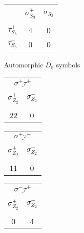 \documentclass[12pt]{article}
\begin{document}
\begin{center}
\begin{tabular}{ c | c | c |}
\multicolumn{1}{c}{} & \multicolumn{1}{c}{} & \multicolumn{1}{c}{}\\
\multicolumn{1}{c}{} & \multicolumn{1}{c}{$\sigma_{S_3}^+$} & \multicolumn{1}{c}{$\sigma_{S_3}^-$} \\[-1em]
\multicolumn{1}{c}{} & \multicolumn{1}{c}{} & \multicolumn{1}{c}{} \\
\cline{2-3} $\tau_{S_3}^+$ & 4 & 0 \\
\cline{2-3} $\tau_{S_3}^-$ & 0 & 0 \\
\cline{2-3}
\end{tabular}
\vspace{.6cm}

Automorphic $D_5$ symbols

\begin{tabular}{| c | c |}
\multicolumn{2}{c}{$\underline{\sigma^+ \tau^+}$} \\[-1em]
\multicolumn{1}{c}{} & \multicolumn{1}{c}{} \\
\multicolumn{1}{c}{$\sigma_{Z_2}^+$} & \multicolumn{1}{c}{$\sigma_{Z_2}^-$} \\[-1em]
\multicolumn{1}{c}{} & \multicolumn{1}{c}{} \\
\hline
22 & 0 \\
\hline
\end{tabular} 
\hspace{1.2cm}
\begin{tabular}{| c | c |}
\multicolumn{2}{c}{$\underline{\sigma^+ \tau^-}$} \\[-1em]
\multicolumn{1}{c}{} & \multicolumn{1}{c}{} \\
\multicolumn{1}{c}{$\sigma_{Z_2}^+$} & \multicolumn{1}{c}{$\sigma_{Z_2}^-$} \\[-1em]
\multicolumn{1}{c}{} & \multicolumn{1}{c}{} \\
\hline
11 & 0 \\
\hline
\end{tabular} 
\hspace{1.2cm}
\begin{tabular}{| c | c |}
\multicolumn{2}{c}{$\underline{\sigma^- \tau^+}$} \\[-1em]
\multicolumn{1}{c}{} & \multicolumn{1}{c}{} \\
\multicolumn{1}{c}{$\sigma_{Z_2}^+$} & \multicolumn{1}{c}{$\sigma_{Z_2}^-$} \\[-1em]
\multicolumn{1}{c}{} & \multicolumn{1}{c}{} \\
\hline
0 & 4 \\
\hline
\end{tabular} 

\end{center}
\end{document}
